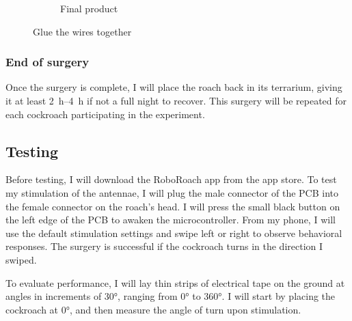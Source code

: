 \begin{figure}[ht!]
\begin{subfigure}{.49\textwidth}
    \caption{Final product}
    \label{fig:gluewires2}
    \end{subfigure}
\caption{Glue the wires together}
\label{fig:connectorC}
\end{figure}

\subsubsection{End of surgery}
Once the surgery is complete, I will place the roach back in its terrarium, giving it at least \SIrange{2}{4}{\hour} if not a full night to recover. This surgery will be repeated for each cockroach participating in the experiment.


\subsection{Testing}
Before testing, I will download the RoboRoach app from the app store. To test my stimulation of the antennae, I will plug the male connector of the PCB into the female connector on the roach's head. I will press the small black button on the
left edge of the PCB to awaken the microcontroller. From my phone, I will use the default stimulation settings and swipe left or right to observe behavioral responses. The surgery is successful if the cockroach turns in the direction I swiped.

To evaluate performance, I will lay thin strips of electrical tape on the ground at angles in increments of \ang{30}, ranging from \ang{0} to \ang{360}. I will start by placing the cockroach at \ang{0}, and then measure the angle of turn upon stimulation. 






















